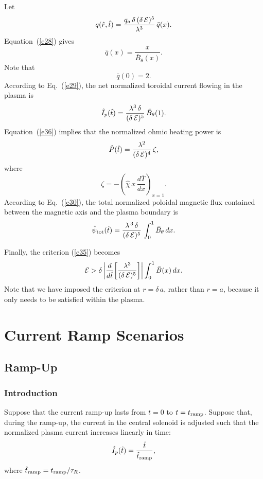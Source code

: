 \documentclass[12pt,prb,aps]{revtex4-1}
\begin{document}
Let
\begin{equation}
q(\hat{r},\hat{t}) =\frac{q_a\,\delta\,(\delta\,{\cal E})^5}{\lambda^3}\,\bar{q}(x).
\end{equation}
Equation~(\ref{e28}) gives
\begin{equation}
\bar{q}(x) = \frac{x}{\bar{B}_\theta(x)}.
\end{equation}
Note that
\begin{equation}
\bar{q}(0)= 2.
\end{equation}
According to Eq.~(\ref{e29}), the net normalized toroidal current flowing in the plasma is
\begin{equation}
\hat{I}_p(\hat{t}) = \frac{\lambda^3\,\delta}{(\delta\,{\cal E})^5}\,\bar{B}_\theta(1).
\end{equation}
Equation~(\ref{e36}) implies that the normalized ohmic heating power is
\begin{equation}
\hat{P}(\hat{t})= \frac{\lambda^2}{(\delta\,{\cal E})^4}\,\zeta,
\end{equation}
where
\begin{equation}
\zeta = - \left(\hat{\chi}\,x\,\frac{d\bar{T}}{dx}\right)_{x=1}.
\end{equation}
According to Eq.~(\ref{e30}), the total normalized poloidal magnetic flux contained between the magnetic axis and the plasma
boundary is
\begin{equation}
\hat{\psi}_{\rm tot}(\hat{t}) = \frac{\lambda^{\,3}\,\delta}{(\delta\,{\cal E})^5}\,\int_0^1\bar{B}_\theta\,dx.
\end{equation}

Finally, the criterion (\ref{e35}) becomes 
\begin{equation}\label{e55}
{\cal E}> \delta\left|\frac{d}{d\hat{t}}\!\left[\frac{\lambda^3}{(\delta\,{\cal E})^5}\right]\right|\int_0^1\bar{B}(x)\,dx.
\end{equation}
Note that we have imposed the criterion at $r=\delta\,a$, rather than $r=a$, because it only needs to be satisfied
within the plasma. 

\section{Current Ramp Scenarios}
\subsection{Ramp-Up}
\subsubsection{Introduction}
Suppose that the current ramp-up lasts from $t=0$ to $t=t_{\rm ramp}$. Suppose that, during the ramp-up, the current in the central solenoid is adjusted such that
the normalized plasma current increases linearly in time:
\begin{equation}\label{e56}
\hat{I}_p(\hat{t}) = \frac{\hat{t}}{\hat{t}_{\rm ramp}},
\end{equation}
where $\hat{t}_{\rm ramp} =t_{\rm ramp}/\tau_R$. 
\end{document}
